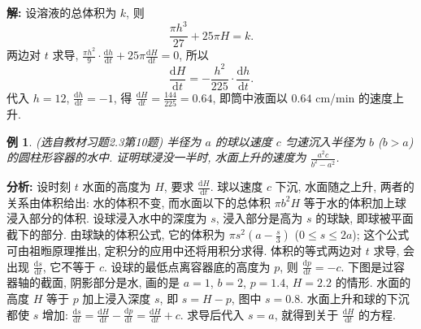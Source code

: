 \documentclass[UTF8,openany]{ctexbook}
\theoremstyle{chinesetextbook}
\newtheorem{example}{例}[section]
\newenvironment{cnsolution}{\par\indent\textbf{解:} \ignorespaces}{\par}
\newcommand{\dd}{\mathrm d}
\begin{document}
\begin{cnsolution}
设溶液的总体积为 $k$, 则
\[
\frac{\pi h^3}{27}+25\pi H=k.
\]
两边对 $t$ 求导, $\displaystyle\frac{\pi h^2}9\cdot\frac{\dd h}{\dd t}+25\pi\frac{\dd H}{\dd t}=0$, 所以
\[
\frac{\dd H}{\dd t}=-\frac{h^2}{225}\cdot\frac{\dd h}{\dd t}.
\]
代入 $h=12$, $\displaystyle\frac{\dd h}{\dd t}=-1$, 得 $\displaystyle\frac{\dd H}{\dd t}=\frac{144}{225}=0.64$, 即筒中液面以 $0.64$ cm/min 的速度上升.
\end{cnsolution}
\begin{example}\label{ex:c2-h3-10}
\textnormal{(选自教材习题2.3第10题)} 半径为 $a$ 的球以速度 $c$ 匀速沉入半径为 $b$ ($b>a$) 的圆柱形容器的水中. 证明球浸没一半时, 水面上升的速度为 $\displaystyle\frac{a^2c}{b^2-a^2}$.
\end{example}
\par\indent\textbf{分析:} 设时刻 $t$ 水面的高度为 $H$, 要求 $\displaystyle\frac{\dd H}{\dd t}$. 球以速度 $c$ 下沉, 水面随之上升, 两者的关系由体积给出: 水的体积不变, 而水面以下的总体积 $\pi b^2H$ 等于水的体积加上球浸入部分的体积. 设球浸入水中的深度为 $s$, 浸入部分是高为 $s$ 的球缺, 即球被平面截下的部分. 由球缺的体积公式, 它的体积为 $\displaystyle\pi s^2\left(a-\frac s3\right)$ ($0\le s\le2a$); 这个公式可由祖暅原理推出, 定积分的应用中还将用积分求得. 体积的等式两边对 $t$ 求导, 会出现 $\displaystyle\frac{\dd s}{\dd t}$, 它不等于 $c$. 设球的最低点离容器底的高度为 $p$, 则 $\displaystyle\frac{\dd p}{\dd t}=-c$. 下图是过容器轴的截面, 阴影部分是水, 画的是 $a=1$, $b=2$, $p=1.4$, $H=2.2$ 的情形. 水面的高度 $H$ 等于 $p$ 加上浸入深度 $s$, 即 $s=H-p$, 图中 $s=0.8$. 水面上升和球的下沉都使 $s$ 增加: $\displaystyle\frac{\dd s}{\dd t}=\frac{\dd H}{\dd t}-\frac{\dd p}{\dd t}=\frac{\dd H}{\dd t}+c$. 求导后代入 $s=a$, 就得到关于 $\displaystyle\frac{\dd H}{\dd t}$ 的方程.
\begin{center}
\end{center}
\end{document}
